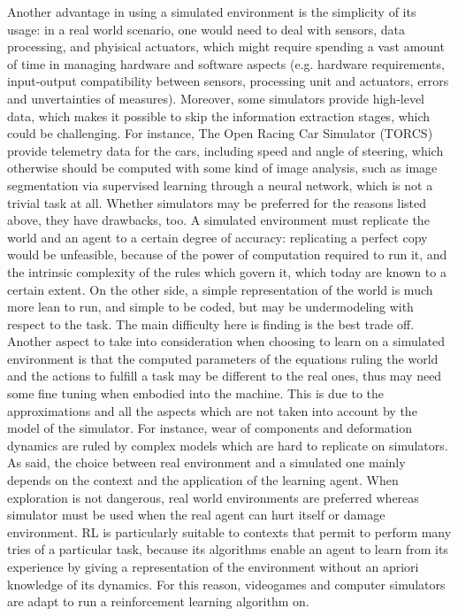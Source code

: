 Another advantage in using a simulated environment is the simplicity of its usage: in a real world scenario, one would need to deal with sensors, data processing, and phyisical actuators, which might require spending a vast amount of time in managing hardware and software aspects (e.g. hardware requirements, input-output compatibility between sensors, processing unit and actuators, errors and unvertainties of measures). Moreover, some simulators provide high-level data, which makes it possible to skip the information extraction stages, which could be challenging. For instance, The Open Racing Car Simulator (TORCS) provide telemetry data for the cars, including speed and angle of steering, which otherwise should be computed with some kind of image analysis, such as image segmentation via supervised learning through a neural network, which is not a trivial task at all.
Whether simulators may be preferred for the reasons listed above, they have drawbacks, too. A simulated environment must replicate the world and an agent to a certain degree of accuracy: replicating a perfect copy would be unfeasible, because of the power of computation required to run it, and the intrinsic complexity of the rules which govern it, which today are known to a certain extent. On the other side, a simple representation of the world is much more lean to run, and simple to be coded, but may be undermodeling with respect to the task. The main difficulty here is finding is the best trade off.
Another aspect to take into consideration when choosing to learn on a simulated environment is that the computed parameters of the equations ruling the world and the actions to fulfill a task may be different to the real ones, thus may need some fine tuning when embodied into the machine. This is due to the approximations and all the aspects which are not taken into account by the model of the simulator. For instance, wear of components and deformation dynamics are ruled by complex models which are hard to replicate on simulators.
As said, the choice between real environment and a simulated one mainly depends on the context and the application of the learning agent. When exploration is not dangerous, real world environments are preferred whereas simulator must be used when the real agent can hurt itself or damage environment.
RL is particularly suitable to contexts that permit to perform many tries of a particular task, because its algorithms enable an agent to learn from its experience by giving a representation of the environment without an apriori knowledge of its dynamics. For this reason, videogames and computer simulators are adapt to run a reinforcement learning algorithm on.
